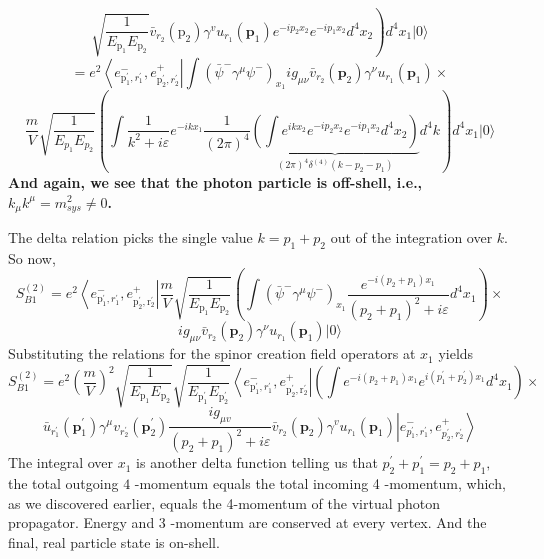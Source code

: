$$
\left.\sqrt{\frac{1}{E_{\mathrm{p}_{1}} E_{\mathrm{p}_{2}}}} \bar{v}_{r_{2}}\left(\mathrm{p}_{2}\right) \gamma^{v} u_{r_{1}}\left(\mathbf{p}_{1}\right) e^{-i p_{2} x_{2}} e^{-i p_{1} x_{2}} d^{4} x_{2}\right) d^{4} x_{1}|0\rangle
$$
$$
=e^{2}\left\langle e^-_{\mathrm{p}_{1}^{\prime}, r_{1}^{\prime}}, e_{\mathrm{p}_{2}^{\prime}, r_{2}^{\prime}}^{+}\right| \int\left(\bar{\psi}^- \gamma^{\mu} \psi^{-}\right)_{x_{1}} i g_{\mu \nu} \bar{v}_{r_{2}}\left(\mathbf{p}_{2}\right) \gamma^{\nu} u_{r_{1}}\left(\mathbf{p}_{1}\right) \times
$$
$$
\frac{m}{V} \sqrt{\frac{1}{E_{p_{1}} E_{p_{2}}}}\left(\int \frac{1}{k^{2}+i \varepsilon} e^{-i k x_{1}} \frac{1}{(2 \pi)^{4}}\underbrace{\left(\int e^{i k x_{2}} e^{-i p_{2} x_{2}} e^{-i p_{1} x_{2}} d^{4} x_{2}\right)}_{(2 \pi)^{4} \delta^{(4)}\left(k-p_{2}-p_{1}\right)} d^{4} k\right) d^{4} x_{1}|0\rangle
$$
 \textbf{And again, we see that the photon particle is off-shell, i.e.,$k_{\mu}k^{\mu}=m^2_{sys}\neq0$.}

The delta relation picks the single value $k=p_1+p_2$ out of the integration over $k$. So now,
$$
S_{B 1}^{(2)}=e^{2}\left\langle e_{\mathrm{p}_{1}^{\prime}, r_{1}^{\prime}}^{-}, e_{\mathrm{p}_{2}^{\prime}, \mathrm{r}_{2}^{\prime}}^{+}\right| \frac{m}{V}\sqrt{\frac{1}{E_{\mathrm{p}_{1}} E_{\mathrm{p}_{2}}}}\left(\int\left(\bar{\psi}^- \gamma^{\mu} \psi^{-}\right)_{x_{1}} \frac{e^{-i\left(p_{2}+p_{1}\right) x_{1}}}{\left(p_{2}+p_{1}\right)^{2}+i \varepsilon} d^{4} x_{1}\right)\times$$
$$ i g_{\mu \nu}\bar{v}_{r_{2}}\left(\mathbf{p}_{2}\right) \gamma^{\nu} u_{r_{1}}\left(\mathbf{p}_{1}\right)|0\rangle
$$
Substituting the relations for the spinor creation field operators at $x_1$ yields
$$
S_{B 1}^{(2)}=e^{2}\left(\frac{m}{V}\right)^{2} \sqrt{\frac{1}{E_{\mathrm{p}_{1}} E_{\mathrm{p}_{2}}}} \sqrt{\frac{1}{E_{\mathrm{p}^{\prime}_{1}} E_{\mathrm{p}^{\prime}_{2}}}}\left\langle e_{\mathrm{p}_{1}^{\prime}, r_1^{\prime}}^{-}, e_{\mathrm{p}_{2}^{\prime}, \mathrm{r}_{2}^{\prime}}^{+}\right|\left(\int e^{-i\left(p_{2}+p_{1}\right) x_{1}} e^{i\left(p_{1}^{\prime}+p_{2}^{\prime}\right) x_{1}} d^{4} x_{1}\right) \times
$$
$$
\bar{u}_{r_{1}^{\prime}}\left(\mathbf{p}_{1}^{\prime}\right) \gamma^{\mu} v_{r_{2}^{\prime}}\left(\mathbf{p}_{2}^{\prime}\right) \frac{i g_{\mu v}}{\left(p_{2}+p_{1}\right)^{2}+i \varepsilon} \bar{v}_{r_{2}}\left(\mathbf{p}_{2}\right) \gamma^{v} u_{r_{1}}\left(\mathbf{p}_{1}\right)\left|e_{p_{1}^{\prime}, r_{1}^{\prime}}^-, e^{+}_{p_2^{\prime}, r_{2}^{\prime}}\right\rangle
$$
The integral over $x_{1}$ is another delta function telling us that $p_{2}^{\prime}+p^{\prime}_{1}=p_{2}+p_{1},$ the total outgoing $4$ -momentum equals the total incoming 4 -momentum, which, as we discovered earlier, equals the 4-momentum of the virtual photon propagator. Energy and 3 -momentum are conserved at every vertex. And the final, real particle state is on-shell.

